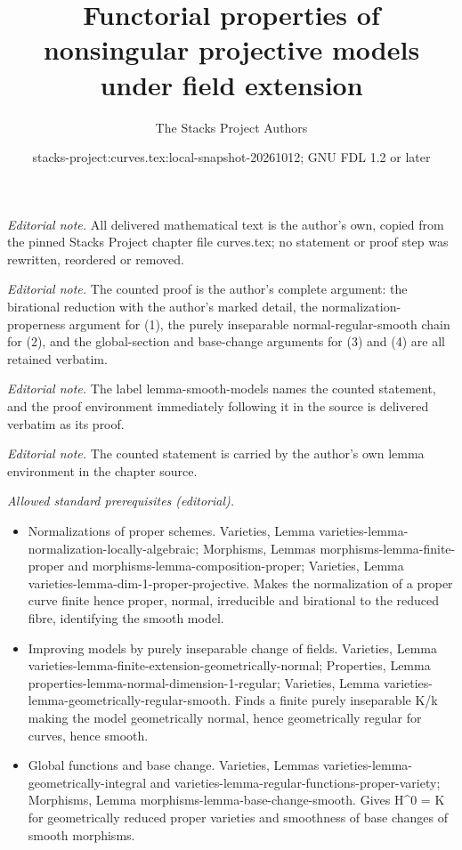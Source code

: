\documentclass[10pt,a4paper]{amsart}
\title{Functorial properties of nonsingular projective models under field extension}
\author{The Stacks Project Authors}
\date{stacks-project:curves.tex:local-snapshot-20261012; GNU FDL 1.2 or later}
\theoremstyle{plain}
\theoremstyle{definition}
\theoremstyle{remark}
\numberwithin{equation}{subsection}
\begin{document}
\maketitle
\noindent\textit{Editorial note.} All delivered mathematical text is the author's own, copied from the pinned Stacks Project chapter file curves.tex; no statement or proof step was rewritten, reordered or removed.\par\medskip
\noindent\textit{Editorial note.} The counted proof is the author's complete argument: the birational reduction with the author's marked detail, the normalization-properness argument for (1), the purely inseparable normal-regular-smooth chain for (2), and the global-section and base-change arguments for (3) and (4) are all retained verbatim.\par\medskip
\noindent\textit{Editorial note.} The label lemma-smooth-models names the counted statement, and the proof environment immediately following it in the source is delivered verbatim as its proof.\par\medskip
\noindent\textit{Editorial note.} The counted statement is carried by the author's own lemma environment in the chapter source.\par\medskip
\noindent\textit{Allowed standard prerequisites (editorial).}\begin{itemize}
\item Normalizations of proper schemes. Varieties, Lemma varieties-lemma-normalization-locally-algebraic; Morphisms, Lemmas morphisms-lemma-finite-proper and morphisms-lemma-composition-proper; Varieties, Lemma varieties-lemma-dim-1-proper-projective. Makes the normalization of a proper curve finite hence proper, normal, irreducible and birational to the reduced fibre, identifying the smooth model.
\item Improving models by purely inseparable change of fields. Varieties, Lemma varieties-lemma-finite-extension-geometrically-normal; Properties, Lemma properties-lemma-normal-dimension-1-regular; Varieties, Lemma varieties-lemma-geometrically-regular-smooth. Finds a finite purely inseparable K/k making the model geometrically normal, hence geometrically regular for curves, hence smooth.
\item Global functions and base change. Varieties, Lemmas varieties-lemma-geometrically-integral and varieties-lemma-regular-functions-proper-variety; Morphisms, Lemma morphisms-lemma-base-change-smooth. Gives H\textasciicircum{}0 = K for geometrically reduced proper varieties and smoothness of base changes of smooth morphisms.
\end{itemize}\medskip
\end{document}
